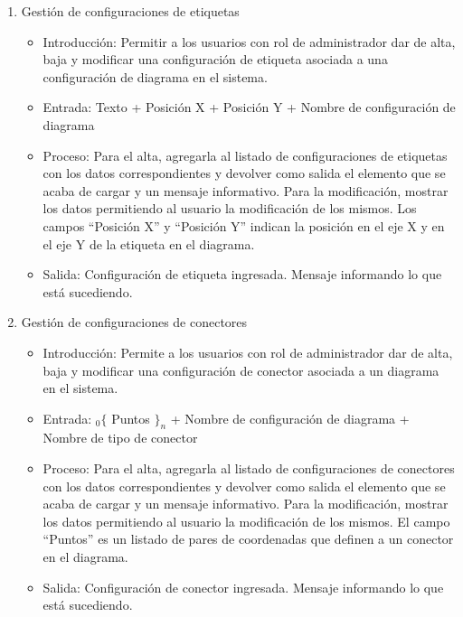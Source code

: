 \begin{enumerate}
			\item Gestión de configuraciones de etiquetas
				\begin{itemize}
					\item Introducción: Permitir a los usuarios con rol de administrador dar de alta, baja y modificar una configuración de etiqueta asociada a una configuración de diagrama en el sistema.
					\item Entrada: Texto + Posición X + Posición Y + Nombre de configuración de diagrama
					\item Proceso: Para el alta, agregarla al listado de configuraciones de etiquetas con los datos correspondientes y devolver como salida el elemento que se acaba de cargar y un mensaje informativo. 
					Para la modificación, mostrar los datos permitiendo al usuario la modificación de los mismos. 
					Los campos ``Posición X'' y ``Posición Y'' indican la posición en el eje X y en el eje Y de la etiqueta en el diagrama.
					\item Salida: Configuración de etiqueta ingresada. Mensaje informando lo que está sucediendo.
				\end{itemize}
				
			\item Gestión de configuraciones de conectores
				\begin{itemize}
					\item Introducción: Permite a los usuarios con rol de administrador dar de alta, baja y modificar una configuración de conector asociada a un diagrama en el sistema.
					\item Entrada: ${}_{0}\{$ Puntos $\}_n$ + Nombre de configuración de diagrama + Nombre de tipo de conector
					\item Proceso: Para el alta, agregarla al listado de configuraciones de conectores con los datos correspondientes y devolver como salida el elemento que se acaba de cargar y un mensaje informativo. 
					Para la modificación, mostrar los datos permitiendo al usuario la modificación de los mismos. 
					El campo ``Puntos'' es un listado de pares de coordenadas que definen a un conector en el diagrama.
					\item Salida: Configuración de conector ingresada. Mensaje informando lo que está sucediendo. 
				\end{itemize}
				

\end{enumerate}
